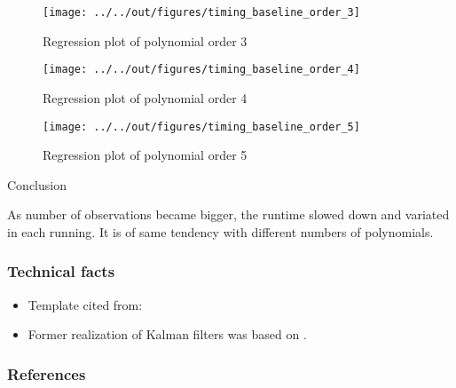 \documentclass[11pt]{beamer}
\begin{document}
\begin{frame}
        \begin{figure}
    \caption{Regression plot of polynomial order 3}
    \texttt{[image: ../../out/figures/timing\_baseline\_order\_3]}
        \end{figure}
\end{frame}


\begin{frame}
        \begin{figure}
    \caption{Regression plot of polynomial order 4}
    \texttt{[image: ../../out/figures/timing\_baseline\_order\_4]}
        \end{figure}
\end{frame}


\begin{frame}
        \begin{figure}
    \caption{Regression plot of polynomial order 5}
    \texttt{[image: ../../out/figures/timing\_baseline\_order\_5]}
        \end{figure}
\end{frame}


\begin{frame}
Conclusion
\end{frame}


\begin{frame}
        As number of observations became bigger, the runtime slowed down and variated in each running. It is of same tendency with different numbers of polynomials.
\end{frame}


\begin{frame}[t]
    \frametitle{Technical facts}
    \begin{itemize}
        \item<+-> Template cited from: \citet{GaudeckerEconProjectTemplates}
        \item<+-> Former realization of Kalman filters was based on \citet{Gabler18}.
    \end{itemize}
    \note{~}
\end{frame}


 {
    \begin{frame}
        \frametitle{}
    \end{frame}

}

\begin{frame}[allowframebreaks]
    \frametitle{References}
    
    
    
\end{frame}
\end{document}

